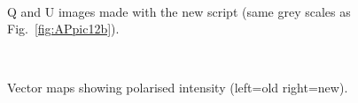 \documentclass[twoside,11pt]{starlink}
\begin{document}
\begin{figure}[H]
\centering
{}
\hspace*{10pt}
\\
\caption{Q and U images made with the new script (same grey scales as
Fig.~\ref{fig:APpic12b}).}
\label{fig:APpic34b}
\end{figure}

\begin{figure}[H]
\centering
{}
\hspace*{10pt}
\\
\caption{Vector maps showing polarised intensity (left=old right=new).}
\label{fig:APpic56b}
\end{figure}
\end{document}
